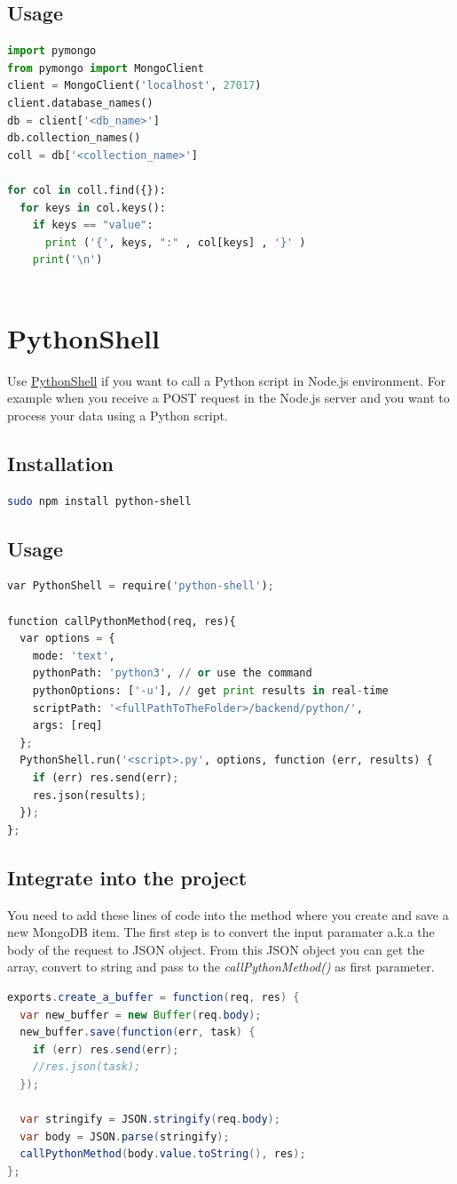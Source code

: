 \documentclass[12pt, a4paper, portrait]{article}
\begin{document}
\subsection{Usage}
\begin{lstlisting}[language=Python]
import pymongo
from pymongo import MongoClient
client = MongoClient('localhost', 27017)
client.database_names()
db = client['<db_name>']
db.collection_names()
coll = db['<collection_name>']

for col in coll.find({}):
  for keys in col.keys(): 
    if keys == "value":
      print ('{', keys, ":" , col[keys] , '}' )
    print('\n')
        
\end{lstlisting}

\pagebreak
\section{PythonShell}
Use \href{https://github.com/extrabacon/python-shell}{PythonShell} if you want to call a Python script in Node.js environment. For example when you receive a POST request in the Node.js server and you want to process your data using a Python script.
\subsection{Installation}
\begin{lstlisting}[language=bash]
sudo npm install python-shell
\end{lstlisting}
\subsection{Usage}
\begin{lstlisting}[language=Python]
var PythonShell = require('python-shell');

function callPythonMethod(req, res){
  var options = {
    mode: 'text',
    pythonPath: 'python3', // or use the command
    pythonOptions: ['-u'], // get print results in real-time
    scriptPath: '<fullPathToTheFolder>/backend/python/',
    args: [req]
  };
  PythonShell.run('<script>.py', options, function (err, results) {
    if (err) res.send(err);
    res.json(results);
  });
};
\end{lstlisting}
\subsection{Integrate into the project}
You need to add these lines of code into the method where you create and save a new MongoDB item. The first step is to convert the input paramater a.k.a the body of the request to JSON object. From this JSON object you can get the array, convert to string and pass to the \textit{callPythonMethod()} as first parameter.
\begin{lstlisting}[language=Java]
exports.create_a_buffer = function(req, res) {
  var new_buffer = new Buffer(req.body);
  new_buffer.save(function(err, task) {
    if (err) res.send(err);
    //res.json(task);
  });
  
  var stringify = JSON.stringify(req.body);
  var body = JSON.parse(stringify);
  callPythonMethod(body.value.toString(), res);
};
\end{lstlisting}
\end{document}
